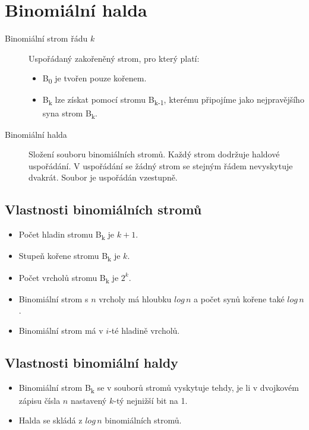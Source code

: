 \section{Binomiální halda}

  \begin{description}
    \item[Binomiální strom řádu $k$] Uspořádaný zakořeněný strom, pro který platí:
    \begin{itemize}
      \item B\textsubscript{0} je tvořen pouze kořenem.
      \item B\textsubscript{k} lze získat pomocí stromu B\textsubscript{k-1}, kterému připojíme jako nejpravějšího syna strom B\textsubscript{k}.
    \end{itemize}
    \item[Binomiální halda] Složení souboru binomiálních stromů. Každý strom dodržuje haldové uspořádání. V uspořádání se žádný strom se stejným řádem nevyskytuje dvakrát. Soubor je uspořádán vzestupně.
  \end{description}

  \subsection{Vlastnosti binomiálních stromů}
    \begin{itemize}
      \item Počet hladin stromu B\textsubscript{k} je $k+1$.
      \item Stupeň kořene stromu B\textsubscript{k} je $k$.
      \item Počet vrcholů stromu B\textsubscript{k} je $2^k$.
      \item Binomiální strom s $n$ vrcholy má hloubku $log \, n$ a počet synů kořene také $log \, n$.
      \item Binomiální strom má v $i$-té hladině  vrcholů.
    \end{itemize}

    \subsection{Vlastnosti binomiální haldy}
      \begin{itemize}
        \item Binomiální strom B\textsubscript{k} se v souborů stromů vyskytuje tehdy, je li v dvojkovém zápisu čísla $n$ nastavený $k$-tý nejnižší bit na 1.
        \item Halda se skládá z $log \, n$ binomiálních stromů.
      \end{itemize}

